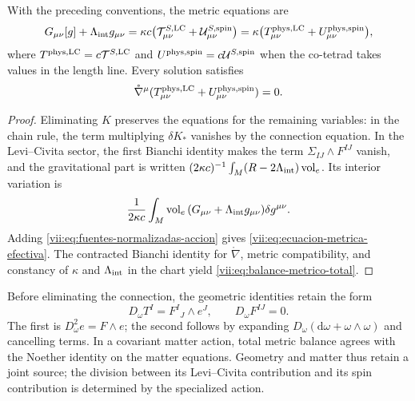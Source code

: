 \begin{proposition}
\label{vii:prop:fuente-metrica-balance}
With the preceding conventions, the metric equations are
\begin{equation}
 G_{\mu\nu}[g]+\Lambda_{\rm int}g_{\mu\nu}
 =\kappa c\bigl(\mathcal T^{S,\rm LC}_{\mu\nu}
                    +\mathcal U^{S,\rm spin}_{\mu\nu}\bigr)
 =\kappa\bigl(T^{\rm phys,LC}_{\mu\nu}
                    +U^{\rm phys,spin}_{\mu\nu}\bigr),
 \label{vii:eq:ecuacion-metrica-efectiva}
\end{equation}
where \(T^{\rm phys,LC}=c\mathcal T^{S,\rm LC}\) and
\(U^{\rm phys,spin}=c\mathcal U^{S,\rm spin}\) when the
co-tetrad takes values in the length line. Every solution satisfies
\begin{equation}
 \mathring\nabla^\mu
   (T^{\rm phys,LC}_{\mu\nu}+U^{\rm phys,spin}_{\mu\nu})=0.
 \label{vii:eq:balance-metrico-total}
\end{equation}
\end{proposition}
\begin{proof}
Eliminating \(K\) preserves the equations for the remaining
variables: in the chain rule, the term multiplying
\(\delta K_*\) vanishes by the connection equation. In the
Levi--Civita sector, the first Bianchi identity makes the term
\(\Sigma_{IJ}\wedge F^{IJ}\) vanish, and the gravitational
part is written
\((2\kappa c)^{-1}\int_M(R-2\Lambda_{\rm int})\operatorname{vol}_e\).
Its interior variation is
\[
 \frac1{2\kappa c}\int_M\operatorname{vol}_e\,
        (G_{\mu\nu}+\Lambda_{\rm int}g_{\mu\nu})\delta g^{\mu\nu}.
\]
Adding \eqref{vii:eq:fuentes-normalizadas-accion} gives
\eqref{vii:eq:ecuacion-metrica-efectiva}. The contracted Bianchi
identity for \(\mathring\nabla\), metric compatibility, and
constancy of \(\kappa\) and \(\Lambda_{\rm int}\) in the
chart yield \eqref{vii:eq:balance-metrico-total}.
\end{proof}

Before eliminating the connection, the geometric identities retain
the form
\begin{equation}
 D_\omega T^I=F^I{}_{J}\wedge e^J,\qquad D_\omega F^{IJ}=0.
 \label{vii:eq:bianchi-cartan}
\end{equation}
The first is \(D_\omega^2e=F\wedge e\); the second follows
by expanding \(D_\omega(\mathrm d\omega+\omega\wedge\omega)\)
and cancelling terms. In a covariant matter action, total metric
balance agrees with the Noether identity on the matter equations.
Geometry and matter thus retain a joint source; the division between
its Levi--Civita contribution and its spin contribution is determined
by the specialized action.
